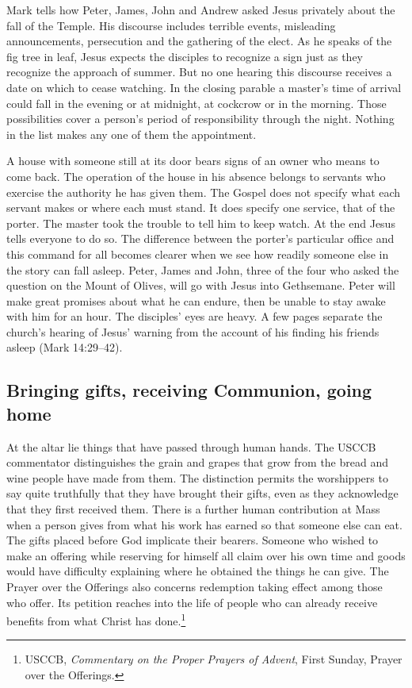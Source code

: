 Mark tells how Peter, James, John and Andrew asked Jesus privately about the fall of the Temple. His discourse includes terrible events, misleading announcements, persecution and the gathering of the elect. As he speaks of the fig tree in leaf, Jesus expects the disciples to recognize a sign just as they recognize the approach of summer. But no one hearing this discourse receives a date on which to cease watching. In the closing parable a master's time of arrival could fall in the evening or at midnight, at cockcrow or in the morning. Those possibilities cover a person's period of responsibility through the night. Nothing in the list makes any one of them the appointment.

A house with someone still at its door bears signs of an owner who means to come back. The operation of the house in his absence belongs to servants who exercise the authority he has given them. The Gospel does not specify what each servant makes or where each must stand. It does specify one service, that of the porter. The master took the trouble to tell him to keep watch. At the end Jesus tells everyone to do so. The difference between the porter's particular office and this command for all becomes clearer when we see how readily someone else in the story can fall asleep. Peter, James and John, three of the four who asked the question on the Mount of Olives, will go with Jesus into Gethsemane. Peter will make great promises about what he can endure, then be unable to stay awake with him for an hour. The disciples' eyes are heavy. A few pages separate the church's hearing of Jesus' warning from the account of his finding his friends asleep (Mark 14:29--42).

\subsection{Bringing gifts, receiving Communion, going home}

At the altar lie things that have passed through human hands. The USCCB commentator distinguishes the grain and grapes that grow from the bread and wine people have made from them. The distinction permits the worshippers to say quite truthfully that they have brought their gifts, even as they acknowledge that they first received them. There is a further human contribution at Mass when a person gives from what his work has earned so that someone else can eat. The gifts placed before God implicate their bearers. Someone who wished to make an offering while reserving for himself all claim over his own time and goods would have difficulty explaining where he obtained the things he can give. The Prayer over the Offerings also concerns redemption taking effect among those who offer. Its petition reaches into the life of people who can already receive benefits from what Christ has done.\footnote{USCCB, \textit{Commentary on the Proper Prayers of Advent}, First Sunday, Prayer over the Offerings.}

